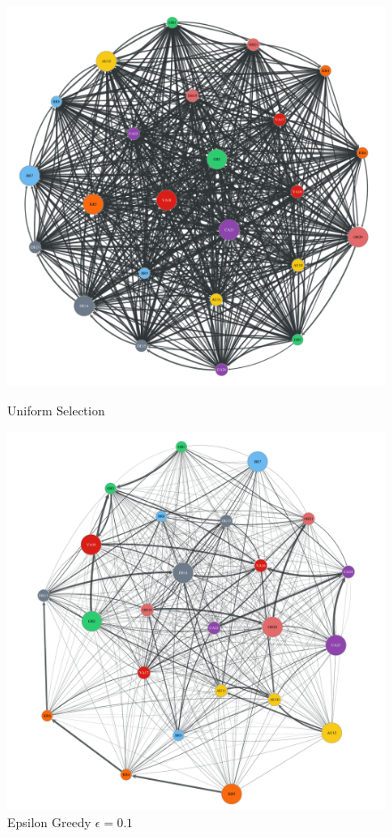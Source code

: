 \begin{figure}[t]
    \centering
      \includegraphics[width=\linewidth]{figures/b-uniform-selection-e1}
      \caption{Uniform Selection}\label{fig:uniform_selection}
    \endminipage\hfill
      \includegraphics[width=\linewidth]{figures/b-epsilon-greedy-0-1-e2}
      \caption{Epsilon Greedy $\epsilon=0.1$}\label{fig:epsilon_greedy_e1}
    \endminipage
\end{figure}

